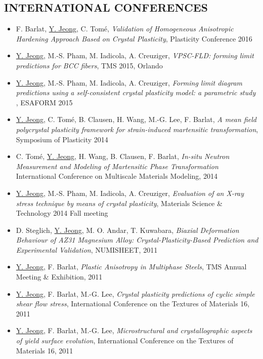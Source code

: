 \documentclass{res}
\begin{document}
\begin{resume}
  \section{INTERNATIONAL CONFERENCES}
  \begin{itemize}
  \item F. Barlat, \underline{Y. Jeong}, C. Tom\'{e}, {\it Validation of Homogeneous Anisotropic Hardening Approach Based on Crystal Plasticity},  Plasticity Conference 2016
  \item \underline{Y. Jeong}, M.-S. Pham, M. Iadicola, A. Creuziger, {\it VPSC-FLD: forming limit predictions for BCC fibers},  TMS 2015, Orlando
  \item \underline{Y. Jeong}, M.-S. Pham, M. Iadicola, A. Creuziger, {\it Forming limit diagram predictions using a self-consistent crystal plasticity model: a parametric study} , ESAFORM 2015
  \item \underline{Y. Jeong}, C. Tom\'{e}, B. Clausen, H. Wang, M.-G. Lee, F. Barlat, {\it A mean field polycrystal plasticity framework for strain-induced martensitic transformation}, Symposium of Plasticity 2014
  \item C. Tom\'{e}, \underline{Y. Jeong}, H. Wang, B. Clausen, F. Barlat, {\it In-situ Neutron  Measurement and Modeling of Martensitic Phase Transformation} International Conference on Multiscale Materials Modeling, 2014
  \item \underline{Y. Jeong}, M.-S. Pham, M. Iadicola, A. Creuziger, {\it Evaluation of an X-ray stress technique by means of crystal plasticity},  Materials Science \& Technology 2014 Fall meeting
  \item D. Steglich, \underline{Y. Jeong}, M. O. Andar, T. Kuwabara, {\it Biaxial Deformation Behaviour of AZ31 Magnesium Alloy: Crystal-Plasticity-Based Prediction and Experimental Validation}, NUMISHEET, 2011
  \item \underline{Y. Jeong}, F. Barlat, {\it Plastic Anisotropy in Multiphase Steels}, TMS Annual Meeting \& Exhibition, 2011
  \item \underline{Y. Jeong}, F. Barlat, M.-G. Lee, {\it Crystal plasticity predictions of cyclic simple shear flow stress}, International Conference on the Textures of Materials 16, 2011
  \item \underline{Y. Jeong}, F. Barlat, M.-G. Lee, {\it Microstructural and crystallographic aspects of yield surface evolution}, International Conference on the Textures of Materials 16, 2011
  \end{itemize}


\end{resume}
\end{document}
